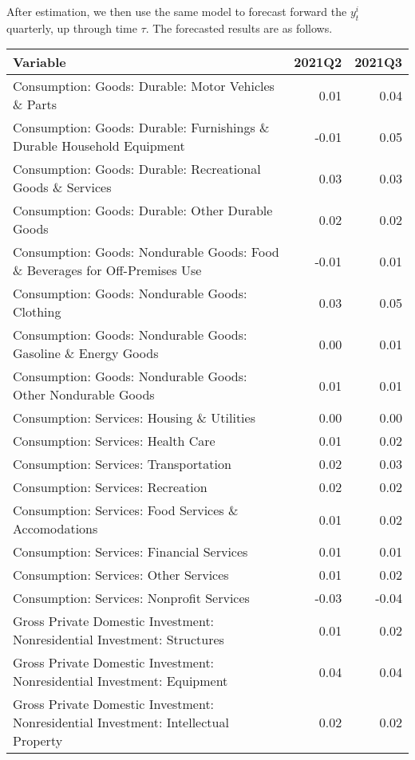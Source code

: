 \documentclass[11pt, letterpaper]{article}\usepackage[]{graphicx}\usepackage[]{color}
\begin{document}
After estimation, we then use the same model to forecast forward the $y^i_t$ quarterly, up through time $\tau$. 
The forecasted results are as follows.
\begin{table}[H]
\centering
\begingroup\scriptsize
\begin{tabular}{lrr}
  \hline
Variable & 2021Q2 & 2021Q3 \\ 
  \hline
Consumption: Goods: Durable: Motor Vehicles \& Parts & 0.01 & 0.04 \\ 
  Consumption: Goods: Durable: Furnishings \& Durable Household Equipment & -0.01 & 0.05 \\ 
  Consumption: Goods: Durable: Recreational Goods \& Services & 0.03 & 0.03 \\ 
  Consumption: Goods: Durable: Other Durable Goods & 0.02 & 0.02 \\ 
  Consumption: Goods: Nondurable Goods: Food \& Beverages for Off-Premises Use & -0.01 & 0.01 \\ 
  Consumption: Goods: Nondurable Goods: Clothing & 0.03 & 0.05 \\ 
  Consumption: Goods: Nondurable Goods: Gasoline \& Energy Goods & 0.00 & 0.01 \\ 
  Consumption: Goods: Nondurable Goods: Other Nondurable Goods & 0.01 & 0.01 \\ 
  Consumption: Services: Housing \& Utilities & 0.00 & 0.00 \\ 
  Consumption: Services: Health Care & 0.01 & 0.02 \\ 
  Consumption: Services: Transportation & 0.02 & 0.03 \\ 
  Consumption: Services: Recreation & 0.02 & 0.02 \\ 
  Consumption: Services: Food Services \& Accomodations & 0.01 & 0.02 \\ 
  Consumption: Services: Financial Services & 0.01 & 0.01 \\ 
  Consumption: Services: Other Services & 0.01 & 0.02 \\ 
  Consumption: Services: Nonprofit Services & -0.03 & -0.04 \\ 
  Gross Private Domestic Investment: Nonresidential Investment: Structures & 0.01 & 0.02 \\ 
  Gross Private Domestic Investment: Nonresidential Investment: Equipment & 0.04 & 0.04 \\ 
  Gross Private Domestic Investment: Nonresidential Investment: Intellectual Property & 0.02 & 0.02 \\ 

\end{tabular}
\end{table}
\end{document}
